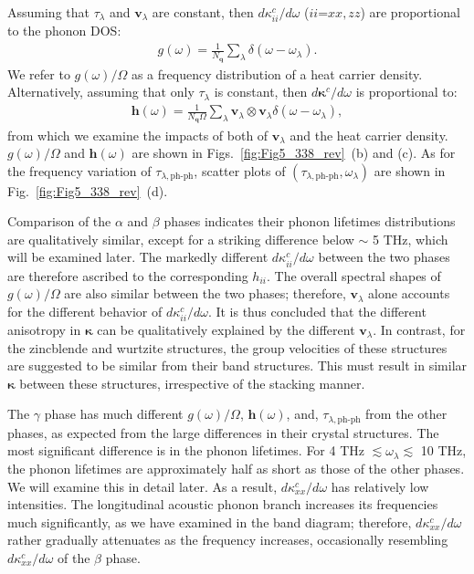 \documentclass[twocolumn,amsmath,amssymb,a4paper,prb,superscriptaddress,floatfix]{revtex4-1}
\begin{document}
Assuming that $\tau_\lambda$ and $\mathbf{v}_\lambda$ are constant, then
$d\kappa_{ii}^c/d\omega$ ($ii$=$xx,zz$) are proportional to the phonon
DOS:
\begin{align}
 \label{eq:dos}
 g(\omega) = \frac{1}{N_\mathbf{q}}
 \sum_\lambda
 \delta(\omega-\omega_{\lambda}).
\end{align}
We refer to $g(\omega)/\Omega$ as a frequency distribution of a heat
carrier density. Alternatively, assuming that only $\tau_\lambda$ is constant,
then $d\boldsymbol{\kappa}^c/d\omega$ is proportional to:
\begin{align}
 \label{eq:wdos}
 \boldsymbol{h}(\omega) = \frac{1}{N_\mathbf{q}\Omega}
 \sum_\lambda
 \mathbf{v}_\lambda \otimes \mathbf{v}_\lambda
 \delta(\omega-\omega_{\lambda}),
\end{align}
from which we examine the impacts of both of $\mathbf{v}_\lambda$ and the heat carrier
density. $g(\omega)/\Omega$ and  $\boldsymbol{h}(\omega)$
are shown in
Figs.~\ref{fig:Fig5_338_rev}~(b) and (c). As for the frequency
variation of $\tau_{\lambda,\text{ph-ph}}$, scatter
plots of $(\tau_{\lambda,\text{ph-ph}},\omega_\lambda)$ are shown in
Fig.~\ref{fig:Fig5_338_rev}~(d).

Comparison of the $\alpha$ and $\beta$ phases indicates their phonon lifetimes
distributions are qualitatively similar, except for a striking difference below
$\sim$ 5 THz, which will be examined later. The markedly different
$d\kappa_{ii}^c/d\omega$ between the two phases are therefore ascribed to the
corresponding $h_{ii}$. The overall spectral shapes of $g(\omega)/\Omega$ are also
similar between the two phases; therefore, $\mathbf{v}_\lambda$ alone accounts
for the different behavior of $d\kappa_{ii}^c/d\omega$. It is thus concluded
that the different anisotropy in $\boldsymbol{\kappa}$ can be qualitatively
explained by the different $\mathbf{v}_\lambda$.
In contrast, for the zincblende and wurtzite
structures, the group velocities of these structures are suggested to be similar from their band
structures\cite{phono3py}.
This must result in similar $\boldsymbol{\kappa}$ between these
structures, irrespective of the stacking manner.

The $\gamma$ phase has much different $g(\omega)/\Omega$, $\boldsymbol{h}(\omega)$,
and, $\tau_{\lambda,\text{ph-ph}}$ from the other phases, as expected from the
large differences in their crystal structures. The most significant difference
is in the phonon lifetimes. For 4 THz $\lesssim\omega_\lambda\lesssim$ 10 THz,
the phonon lifetimes are approximately half as short as those of the other
phases. We will examine this in detail later. As a result,
$d\kappa_{xx}^c/d\omega$ has relatively low intensities. The longitudinal
acoustic phonon branch increases its frequencies much significantly, as we have
examined in the band diagram; therefore, $d\kappa_{xx}^c/d\omega$ rather
gradually attenuates as the frequency increases, occasionally resembling
$d\kappa_{xx}^c/d\omega$ of the $\beta$ phase.
\end{document}
